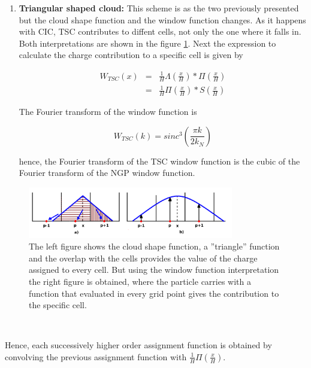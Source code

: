\begin{enumerate}
\item \textbf{ Triangular shaped cloud: } This scheme is as the two previously presented but the cloud
shape function and the window function changes. As it happens with CIC, TSC contributes to diffent
cells, not only the one where it falls in. Both interpretations are shown in the figure \ref{TSC}.
Next the expression to calculate the charge contribution to a specific cell is given by

\begin{eqnarray*}
 W_{TSC}(x)  &=& \frac{1}{H}\Lambda \left( \frac{x}{H} \right)*\Pi \left(\frac{x}{H}\right) \\ 
&  = &\frac{1}{H}\Pi\left(\frac{x}{H}\right)*S\left(\frac{x}{H}\right)
\end{eqnarray*}

The Fourier transform of the window function is 

\[ W_{TSC}(k)= sinc^3\left(\frac{\pi k}{2k_N} \right)\]

hence, the Fourier transform of the TSC window function is the cubic of the Fourier 
transform of the NGP window function. 

\end{enumerate}

\begin{figure}[htbp]
       \centering
               \includegraphics[width=0.8\textwidth]{Images/chapter3/TSC.png}
       \caption{\small The left figure shows the cloud shape function, a ''triangle'' function
       and the overlap with the cells provides the value of the charge assigned to every cell. But
       using the window function interpretation the right figure is obtained, where the particle carries
       with a function that evaluated in every grid point gives the contribution to the specific cell. }
       \label{TSC}
 \end{figure}

\

Hence, each successively higher order assignment function is obtained by convolving the previous
assignment function with $\frac{1}{H}\Pi\left(\frac{x}{H}\right)$. 

